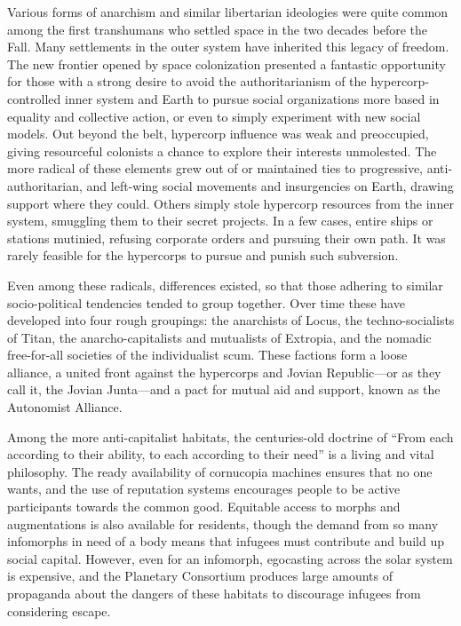 Various forms of anarchism and similar libertarian 
ideologies were quite common among the first transhumans who settled space in the two decades before 
the Fall. Many settlements in the outer system have 
inherited this legacy of freedom. The new frontier 
opened by space colonization presented a fantastic 
opportunity for those with a strong desire to avoid 
the authoritarianism of the hypercorp-controlled 
inner system and Earth to pursue social organizations 
more based in equality and collective action, or even 
to simply experiment with new social models. Out 
beyond the belt, hypercorp influence was weak and 
preoccupied, giving resourceful colonists a chance to 
explore their interests unmolested. The more radical 
of these elements grew out of or maintained ties to 
progressive, anti-authoritarian, and left-wing social 
movements and insurgencies on Earth, drawing support where they could. Others simply stole hypercorp 
resources from the inner system, smuggling them 
to their secret projects. In a few cases, entire ships 
or stations mutinied, refusing corporate orders and 
pursuing their own path. It was rarely feasible for the 
hypercorps to pursue and punish such subversion.

Even among these radicals, differences existed, so 
that those adhering to similar socio-political tendencies tended to group together. Over time these have 
developed into four rough groupings: the anarchists 
of Locus, the techno-socialists of Titan, the anarcho-capitalists and mutualists of Extropia, and the nomadic free-for-all societies of the individualist scum. 
These factions form a loose alliance, a united front 
against the hypercorps and Jovian Republic—or as 
they call it, the Jovian Junta—and a pact for mutual 
aid and support, known as the Autonomist Alliance.

Among the more anti-capitalist habitats, the centuries-old doctrine of ``From each according to their 
ability, to each according to their need'' is a living and 
vital philosophy. The ready availability of cornucopia 
machines ensures that no one wants, and the use of 
reputation systems encourages people to be active participants towards the common good. Equitable access 
to morphs and augmentations is also available for residents, though the demand from so many infomorphs 
in need of a body means that infugees must contribute 
and build up social capital. However, even for an infomorph, egocasting across the solar system is expensive, 
and the Planetary Consortium produces large amounts 
of propaganda about the dangers of these habitats to 
discourage infugees from considering escape.

